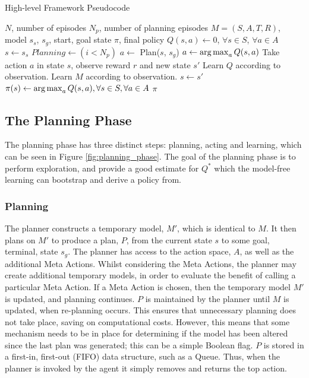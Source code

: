 \begin{algorithm}
\caption{High-level Framework Pseudocode}
\label{alg:framework_pc}
\begin{algorithmic}
\REQUIRE $N$, number of episodes
\REQUIRE $N_p$, number of planning episodes
\REQUIRE $M=(S,A,T,R)$, model
\REQUIRE $s_s$, $s_g$, start, goal state
\ENSURE $\pi$, final policy
\STATE $Q(s,a) \leftarrow 0 $, $\forall s \in S$, $\forall a \in A$
\STATE $s \leftarrow s_s$
    \STATE $Planning \leftarrow (i < N_p)$
            \STATE $a \leftarrow$ Plan($s$, $s_g$)
        \ELSE
            \STATE $a \leftarrow \operatorname*{arg\,max}_a Q(s,a)$
        \ENDIF
        \STATE Take action $a$ in state $s$, observe reward $r$ and new state $s'$
        \STATE Learn $Q$ according to observation.
            \STATE Learn $M$ according to observation.
        \ENDIF
        \STATE $s \leftarrow s'$
    \ENDWHILE
\ENDFOR
\STATE $\pi(s) \leftarrow \operatorname*{arg\,max}_a Q(s,a), \forall s \in S, \forall a \in A$
\RETURN $\pi$
\end{algorithmic}
\end{algorithm}

\subsection{The Planning Phase}
The planning phase has three distinct steps: planning, acting and learning, which can be seen in Figure \ref{fig:planning_phase}. The goal of the planning phase is to perform exploration, and provide a good estimate for $Q^*$ which the model-free learning can bootstrap and derive a policy from.

\subsubsection{Planning}
The planner constructs a temporary model, $M'$, which is identical to $M$. It then plans on $M'$ to produce a plan, $P$, from the current state $s$ to some goal, terminal, state $s_g$. The planner has access to the action space, $A$, as well as the additional Meta Actions. Whilst considering the Meta Actions, the planner may create additional temporary models, in order to evaluate the benefit of calling a particular Meta Action. If a Meta Action is chosen, then the temporary model $M'$ is updated, and planning continues. $P$ is maintained by the planner until $M$ is updated, when re-planning occurs. This ensures that unnecessary planning does not take place, saving on computational costs. However, this means that some mechanism needs to be in place for determining if the model has been altered since the last plan was generated; this can be a simple Boolean flag. $P$ is stored in a first-in, first-out (FIFO) data structure, such as a Queue. Thus, when the planner is invoked by the agent it simply removes and returns the top action.
